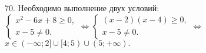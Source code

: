 70. Необходимо выполнение двух условий: $\begin{cases} x^2-6x+8\geqslant0,\\ x-5\neq0.\end{cases}\Leftrightarrow
\begin{cases} (x-2)(x-4)\geqslant0,\\ x-5\neq0.\end{cases}
\Leftrightarrow$\\$ x\in (-\infty;2]\cup[4;5)\cup(5;+\infty).$\\
